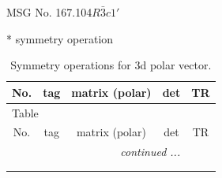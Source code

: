 \documentclass[fleqn,8pt]{jsarticle}
\begin{document}
\setcounter{MaxMatrixCols}{32}

\renewcommand{\tablename}{Table~}
\renewcommand{\figurename}{Figure~}
\begin{center}
\LARGE
MSG No. 167.104\quad$R\bar{3}c1'$
\end{center}
* symmetry operation
\renewcommand{\arraystretch}{1.3}
\begin{longtable}{ccccc}
\caption{Symmetry operations for 3d polar vector.}
 \\
 \hline \hline
No. & tag & matrix (polar) & det & TR \\ \hline \endfirsthead

\multicolumn{4}{l}{\tablename\ \thetable{}} \\
 \hline \hline
No. & tag & matrix (polar) & det & TR \\ \hline \endhead

 \hline \hline
\multicolumn{4}{r}{\footnotesize\it continued ...} \\ \endfoot

 \hline \hline
\multicolumn{4}{r}{} \\ \endlastfoot


\end{longtable}
\end{document}

